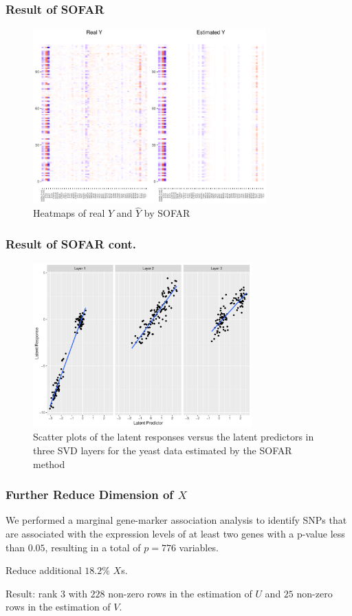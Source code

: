 \begin{frame}
    \frametitle{Result of SOFAR}
    \begin{figure}[h]
        \centering
        \includegraphics[width=0.8\textwidth]{./figs/heatmap1.pdf}
        \caption{Heatmaps of real $Y$ and $\hat{Y}$ by SOFAR}
    \end{figure}
\end{frame}

\begin{frame}
    \frametitle{Result of SOFAR cont.}
    \begin{figure}[h]
        \centering
        \includegraphics[width=0.75\textwidth]{./figs/latent1.pdf}
        \caption{Scatter plots of the latent responses versus the latent predictors in three SVD layers for the yeast data estimated by the SOFAR method}
    \end{figure}
\end{frame}


\begin{frame}
    \frametitle{Further Reduce Dimension of $X$}

    We performed a marginal gene-marker association analysis to identify SNPs that are associated with the expression levels of at least two genes with a p-value less than $0.05$, resulting in a total of $p = 776$ variables.

    Reduce additional $18.2\%$ $X$s. 

    Result: rank $3$ with $228$ non-zero rows in the estimation of $U$ and $25$ non-zero rows in the estimation of $V$. 
\end{frame}


